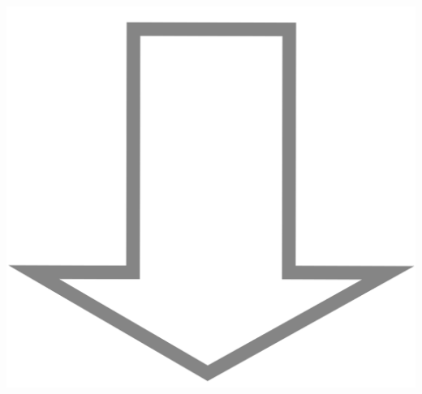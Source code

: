 \documentclass[10pt,a4paper,oneside]{article}
\begin{document}
\begin{center}
	\includegraphics[scale=0.01]{down_arrow.png}


\end{center}
\end{document}

